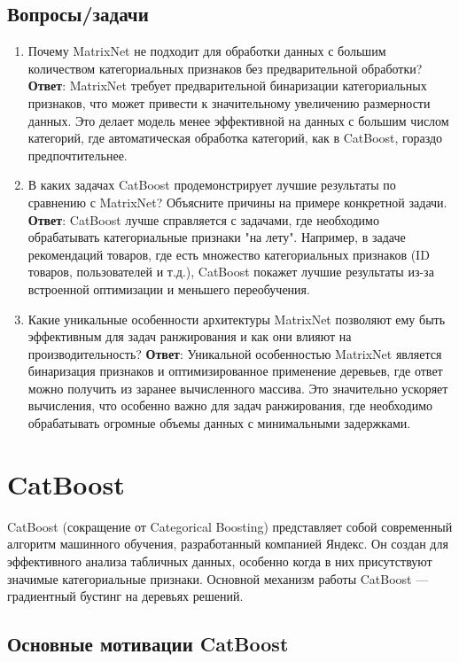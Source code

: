 \subsection{Вопросы/задачи}
\begin{enumerate}
    \item Почему MatrixNet не подходит для обработки данных с большим количеством категориальных признаков без предварительной обработки?
          \textbf{Ответ}: MatrixNet требует предварительной бинаризации категориальных признаков, что может привести к значительному увеличению размерности данных. Это делает модель менее эффективной на данных с большим числом категорий, где автоматическая обработка категорий, как в CatBoost, гораздо предпочтительнее.

    \item В каких задачах CatBoost продемонстрирует лучшие результаты по сравнению с MatrixNet? Объясните причины на примере конкретной задачи.
          \textbf{Ответ}: CatBoost лучше справляется с задачами, где необходимо обрабатывать категориальные признаки "на лету". Например, в задаче рекомендаций товаров, где есть множество категориальных признаков (ID товаров, пользователей и т.д.), CatBoost покажет лучшие результаты из-за встроенной оптимизации и меньшего переобучения.

    \item Какие уникальные особенности архитектуры MatrixNet позволяют ему быть эффективным для задач ранжирования и как они влияют на производительность?
          \textbf{Ответ}: Уникальной особенностью MatrixNet является бинаризация признаков и оптимизированное применение деревьев, где ответ можно получить из заранее вычисленного массива. Это значительно ускоряет вычисления, что особенно важно для задач ранжирования, где необходимо обрабатывать огромные объемы данных с минимальными задержками.
\end{enumerate}


\section{CatBoost}

CatBoost (сокращение от Categorical Boosting) представляет собой современный алгоритм машинного обучения, разработанный компанией Яндекс. Он создан для эффективного анализа табличных данных, особенно когда в них присутствуют значимые категориальные признаки. Основной механизм работы CatBoost — градиентный бустинг на деревьях решений.

\subsection*{Основные мотивации CatBoost}

